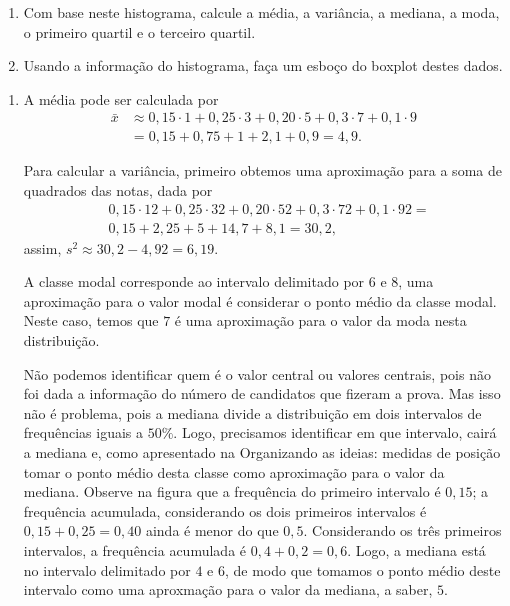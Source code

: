\documentclass[10 pt,usenames,dvipsnames, oneside]{article}
\begin{document}
\begin{enumerate}
\item {} 
Com base neste histograma, calcule a média, a variância, a mediana, a moda, o primeiro quartil e o terceiro quartil.

\item {} 
Usando a informação do histograma, faça um esboço do boxplot destes dados.

\end{enumerate}

\ifdefined\prof
\begin{solucao}

\begin{enumerate}
\item A média pode ser calculada por 
\begin{align*}
\bar{x}&\approx0{,}15\cdot1+0{,}25\cdot3+0{,}20\cdot5+0{,}3\cdot7+0{,}1\cdot9\\
&=0{,}15+0{,}75+1+2{,}1+0{,}9=4{,}9.
\end{align*}

Para calcular a variância, primeiro obtemos uma aproximação para a soma de quadrados das notas, dada por
\begin{align*}
&0{,}15\cdot12+0{,}25\cdot32+0{,}20\cdot52+0{,}3\cdot72+0{,}1\cdot92=\\
&0{,}15+2{,}25+5+14{,}7+8{,}1=30{,}2, 
\end{align*}
assim, $s^2\approx30{,}2−4{,}92=6{,}19$.

A classe modal corresponde ao intervalo delimitado por $6$ e $8$, uma aproximação para o valor modal é considerar o ponto médio da classe modal. Neste caso, temos que $7$ é uma aproximação para o valor da moda nesta distribuição.

Não podemos identificar quem é o valor central ou valores centrais, pois não foi dada a informação do número de candidatos que fizeram a prova. Mas isso não é problema, pois a mediana divide a distribuição em dois intervalos de frequências iguais a $50\%$. Logo, precisamos identificar em que intervalo, cairá a mediana e, como apresentado na Organizando as ideias: medidas de posição tomar o ponto médio desta classe como aproximação para o valor da mediana. Observe na figura que a frequência do primeiro intervalo é $0{,}15$; a frequência acumulada, considerando os dois primeiros intervalos é $0{,}15+0{,}25=0{,}40$ ainda é menor do que $0{,}5$. Considerando os três primeiros intervalos, a frequência acumulada é $0{,}4+0{,}2=0{,}6$. Logo, a mediana está no intervalo delimitado por $4$ e $6$, de modo que tomamos o ponto médio deste intervalo como uma aproxmação para o valor da mediana, a saber, $5$.


\end{enumerate}
\end{solucao}
\end{document}
